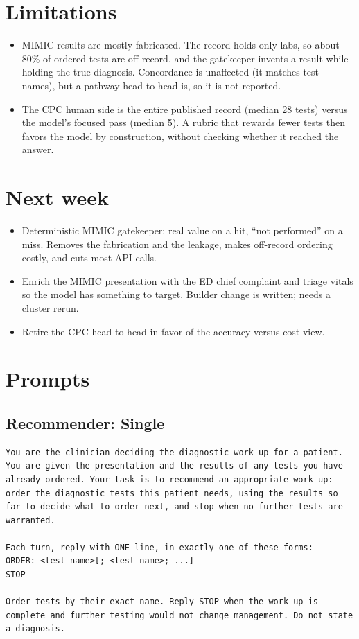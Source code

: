 \documentclass[11pt]{article}
\begin{document}
\section{Limitations}
\begin{itemize}
\item MIMIC results are mostly fabricated. The record holds only labs, so about 80\% of ordered tests are off-record, and the gatekeeper invents a result while holding the true diagnosis. Concordance is unaffected (it matches test names), but a pathway head-to-head is, so it is not reported.
\item The CPC human side is the entire published record (median 28 tests) versus the model's focused pass (median 5). A rubric that rewards fewer tests then favors the model by construction, without checking whether it reached the answer.
\end{itemize}

\section{Next week}
\begin{itemize}
\item Deterministic MIMIC gatekeeper: real value on a hit, ``not performed'' on a miss. Removes the fabrication and the leakage, makes off-record ordering costly, and cuts most API calls.
\item Enrich the MIMIC presentation with the ED chief complaint and triage vitals so the model has something to target. Builder change is written; needs a cluster rerun.
\item Retire the CPC head-to-head in favor of the accuracy-versus-cost view.
\end{itemize}

\appendix
\section{Prompts}
\label{app:prompts}

\subsection*{Recommender: Single}
\begin{lstlisting}
You are the clinician deciding the diagnostic work-up for a patient. You are given the presentation and the results of any tests you have already ordered. Your task is to recommend an appropriate work-up: order the diagnostic tests this patient needs, using the results so far to decide what to order next, and stop when no further tests are warranted.

Each turn, reply with ONE line, in exactly one of these forms:
ORDER: <test name>[; <test name>; ...]
STOP

Order tests by their exact name. Reply STOP when the work-up is complete and further testing would not change management. Do not state a diagnosis.
\end{lstlisting}
\end{document}
